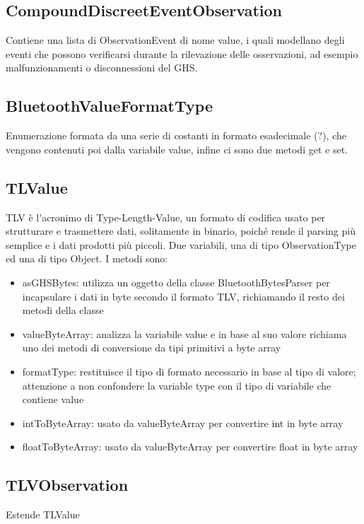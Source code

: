\documentclass[a4paper]{article}
\begin{document}
        \subsection{CompoundDiscreetEventObservation}
            Contiene una lista di ObservationEvent di nome value, i quali modellano degli eventi che possono verificarsi durante
            la rilevazione delle osservazioni, ad esempio malfunzionamenti o disconnessioni del GHS.
        \subsection{BluetoothValueFormatType}
            Enumerazione formata da una serie di costanti in formato esadecimale (?), che vengono contenuti poi
            dalla variabile value, infine ci sono due metodi get e set.
        \subsection{TLValue}
            TLV è l'acronimo di Type-Length-Value, un formato di codifica usato per strutturare e trasmettere dati, solitamente in binario,
            poiché rende il parsing più semplice e i dati prodotti più piccoli.
            Due variabili, una di tipo ObservationType ed una di tipo Object.
            \newline
            I metodi sono:         
            \begin{itemize}
                \item asGHSBytes: utilizza un oggetto della classe BluetoothBytesParser per incapsulare i dati in byte secondo il formato TLV, richiamando il resto dei metodi della classe
                \item valueByteArray: analizza la variabile value e in base al suo valore richiama uno dei metodi di conversione da tipi primitivi a byte array
                \item formatType: restituisce il tipo di formato necessario in base al tipo di valore; attenzione a non confondere la variable type con il tipo di variabile che contiene value
                \item intToByteArray: usato da valueByteArray per convertire int in byte array
                \item floatToByteArray: usato da valueByteArray per convertire float in byte array 
            \end{itemize}
        \subsection{TLVObservation}
            Estende TLValue
\end{document}
